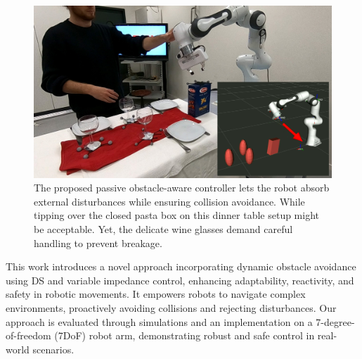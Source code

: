 \begin{figure}
\centerline{\includegraphics[width=.7\columnwidth]{figures/robot_arm_table_avoidance}}
\caption{
The proposed passive obstacle-aware controller lets the robot absorb external disturbances while ensuring collision avoidance. 
While tipping over the closed pasta box on this dinner table setup might be acceptable. Yet, the delicate wine glasses demand careful handling to prevent breakage.
}
\label{fig:table_avoidance_with_obstacle}
\end{figure}

This work introduces a novel approach incorporating dynamic obstacle avoidance using DS and variable impedance control, enhancing adaptability, reactivity, and safety in robotic movements. It empowers robots to navigate complex environments, proactively avoiding collisions and rejecting disturbances. Our approach is evaluated through \iflong simulations and \fi an implementation on a 7-degree-of-freedom (7DoF) robot arm, demonstrating robust and safe control in real-world scenarios.

